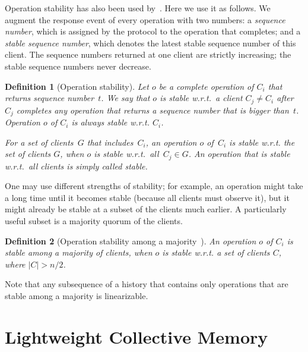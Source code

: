 \documentclass[11pt]{article}
\theoremstyle{plain-boldhead}
\theoremstyle{definition-boldhead}
\newtheorem{definition}{Definition}
\newcommand{\pproj}{Lightweight Collective Memory\xspace}
\begin{document}
Operation stability has also been used by~\cite{ttpdsh95, cakesh11}.
Here we use it as follows.  We augment the response event of every
operation with two numbers: a \emph{sequence number}, which is
assigned by the protocol to the operation that completes; and a
\emph{stable sequence number}, which denotes the latest stable
sequence number of this client.  The sequence numbers returned at one client are strictly increasing; the stable
sequence numbers never decrease.

\begin{definition}[Operation stability]
  \label{def:op-stability}
  Let $o$ be a complete operation of $C_i$ that returns sequence
  number~$t$. We say that $o$ is \emph{stable w.r.t.~a client $C_j \neq C_i$} after
  $C_j$ completes any operation that returns a sequence number that
  is bigger than~$t$.  Operation $o$ of $C_i$ is always stable w.r.t. $C_i$.

  For a set of clients~$G$ that includes~$C_i$, an operation $o$ of~$C_i$
  is \emph{stable w.r.t. the set of clients $G$}, when $o$ is stable
  w.r.t.~all~$C_j \in G$.  An operation that is stable w.r.t.~all clients
  is simply called \emph{stable}.
\end{definition}

One may use different strengths of stability; for example, an operation
might take a long time until it becomes stable (because all clients
must observe it), but it might already be stable at a subset of the clients
much earlier.  A particularly useful subset is a majority quorum of the
clients.

\begin{definition}[Operation stability among a maj\-ori\-ty~\cite{scckms10}]
\label{def:op-stability-majority}
  An operation $o$ of $C_i$ is \emph{stable among a majority} of clients, when
  $o$ is stable w.r.t. a set of clients $C$, where $|C| > n/2$.
\end{definition}

Note that any subsequence of a history that contains only operations that are stable among a majority is linearizable.  



\section{\pproj}\label{sec:arch}
\label{sec:protocol}
\end{document}
